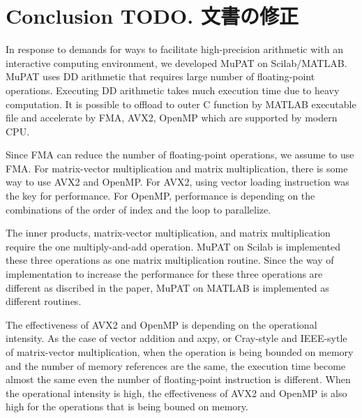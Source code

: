 \documentclass{IOS-Book-Article}
\begin{document}
\section{Conclusion TODO. 文書の修正}
In response to demands for ways to facilitate high-precision arithmetic with an interactive computing environment, 
we developed MuPAT on Scilab/MATLAB. MuPAT uses DD arithmetic that requires large number of floating-point operations. 
Executing DD arithmetic takes much execution time due to heavy computation.
It is possible to offload to outer C function by MATLAB executable file and accelerate by FMA, AVX2, OpenMP which are supported by modern CPU. 

Since FMA can reduce the number of floating-point operations, we assume to use FMA.  
For matrix-vector multiplication and matrix multiplication, there is some way to use AVX2 and OpenMP. 
For AVX2, using vector loading instruction was the key for performance. 
For OpenMP, performance is depending on the combinations of the order of index and the loop to parallelize.




The inner products, matrix-vector multiplication, and matrix multiplication require the one multiply-and-add operation.
MuPAT on Scilab is implemented these three operations as one matrix multiplication routine. 
Since the way of implementation to increase the performance for these three operations are different as discribed in the paper, 
MuPAT on MATLAB is implemented as different routines. 

The effectiveness of AVX2 and OpenMP is depending on the operational intensity. 
As the case of vector addition and axpy, or Cray-style and IEEE-sytle of matrix-vector multiplication, when the operation is being bounded on memory and the number of memory references are the same, 
the execution time become almost the same even the number of floating-point instruction is different. 
When the operational intensity is high, the effectiveness of AVX2 and OpenMP is also high for the operations that is being bouned on memory.
\end{document}
